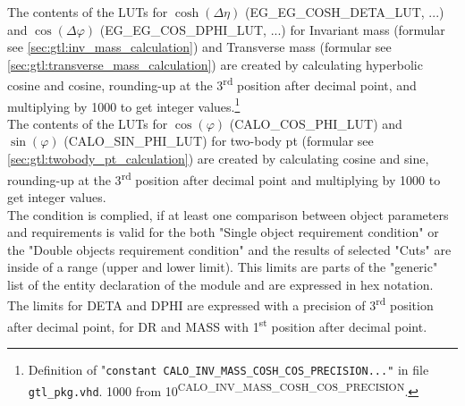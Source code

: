 The contents of the LUTs for $\cosh(\Delta\eta)$ (\small{EG\_EG\_COSH\_DETA\_LUT}\normalsize, ...) and $\cos(\Delta\varphi)$ (\small{EG\_EG\_COS\_DPHI\_LUT}\normalsize, ...) for Invariant mass
(formular see \ref{sec:gtl:inv_mass_calculation}) and Transverse mass (formular see \ref{sec:gtl:transverse_mass_calculation}) are created by calculating hyperbolic cosine and cosine, rounding-up at the 3\textsuperscript{rd} position after decimal point,
and multiplying by 1000 to get integer values.\footnote{Definition of "\texttt{constant \small{CALO\_INV\_MASS\_COSH\_COS\_PRECISION}\normalsize ..."} in file \texttt{gtl\_pkg.vhd}.
1000 from 10\textsuperscript{\tiny{CALO\_INV\_MASS\_COSH\_COS\_PRECISION}}\normalsize.}\\
The contents of the LUTs for $\cos(\varphi)$ (\small{CALO\_COS\_PHI\_LUT}\normalsize) and $\sin(\varphi)$ (\small{CALO\_SIN\_PHI\_LUT}\normalsize) for two-body pt
(formular see \ref{sec:gtl:twobody_pt_calculation}) are created by calculating cosine and sine, rounding-up at the 3\textsuperscript{rd} position after decimal point and 
multiplying by 1000 to get integer values.\\
The condition is complied, if at least one comparison between object parameters and requirements is valid for the both "Single object requirement condition" or the "Double objects requirement condition"
and the results of selected "Cuts" are inside of a range (upper and lower limit).
This limits are parts of the "generic" list of the entity declaration of the module and are expressed in hex notation. The limits for DETA and DPHI
are expressed with a precision of 3\textsuperscript{rd} position after decimal point, for DR and MASS with 1\textsuperscript{st} position after decimal point.

